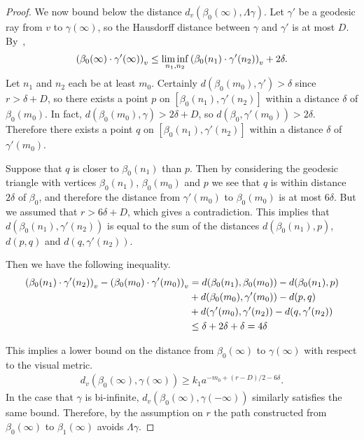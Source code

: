 \begin{proof}
We now bound below the distance $d_v(\beta_0(\infty), \Lambda\gamma)$. Let
$\gamma'$ be a geodesic ray from $v$ to $\gamma(\infty)$, so the Hausdorff
distance between $\gamma$ and $\gamma'$ is at most $D$.
By~\cite[III.H.3.17]{bridsonhaefliger99},
\begin{align*}
  \gromprod[v]{\beta_0(\infty)}{\gamma'(\infty)} \leq
  \liminf_{n_1,n_2}\gromprod[v]{\beta_0(n_1)}{\gamma'(n_2)} + 2\delta.
\end{align*}
Let $n_1$ and $n_2$ each be at least $m_0$. Certainly $d(\beta_0(m_0), \gamma') >
\delta$ since $r > \delta + D$, so there exists a point $p$ on $[\beta_0(n_1),
\gamma'(n_2)]$ within a distance $\delta$ of $\beta_0(m_0)$. In fact, $d(\beta_0(m_0),
\gamma) > 2\delta + D$, so $d(\beta_0, \gamma'(m_0)) > 2\delta$. Therefore there
exists a point $q$ on $[\beta_0(n_1), \gamma'(n_2)]$ within a distance $\delta$ of
$\gamma'(m_0)$. 

Suppose that $q$ is closer to $\beta_0(n_1)$ than $p$. Then by considering the
geodesic triangle with vertices $\beta_0(n_1)$, $\beta_0(m_0)$ and $p$ we see
that $q$ is within distance $2\delta$ of $\beta_0$, and therefore the distance
from $\gamma'(m_0)$ to $\beta_0(m_0)$ is at most $6\delta$. But we assumed that
$r > 6\delta + D$, which gives a contradiction. This implies that
$d(\beta_0(n_1), \gamma'(n_2))$ is equal to the sum of the distances
$d(\beta_0(n_1), p)$, $d(p, q)$ and $d(q, \gamma'(n_2))$.

Then we have the following inequality.
\begin{align*} \gromprod[v]{\beta_0(n_1)}{\gamma'(n_2)} - \gromprod[v]{\beta_0(m_0)
    }{\gamma'(m_0)} 
    & = d(\beta_0(n_1), \beta_0(m_0)) - d(\beta_0(n_1), p) \\
    & + d(\beta_0(m_0), \gamma'(m_0)) - d(p, q) \\
    & + d(\gamma'(m_0), \gamma'(n_2)) - d(q, \gamma'(n_2))\\
    & \leq \delta + 2\delta + \delta = 4\delta
\end{align*}

This implies a lower bound on the distance from $\beta_0(\infty)$ to
$\gamma(\infty)$ with respect to the visual metric.
\begin{align*}
  d_v(\beta_0(\infty), \gamma(\infty)) \geq k_1a^{-m_0 + (r-D)/2 - 6\delta}.
\end{align*}
In the case that $\gamma$ is bi-infinite, $d_v(\beta_0(\infty),
\gamma(-\infty))$ similarly satisfies the same bound.  Therefore, by the
assumption on $r$ the path constructed from $\beta_0(\infty)$ to
$\beta_1(\infty)$ avoids $\Lambda\gamma$.
\end{proof}


